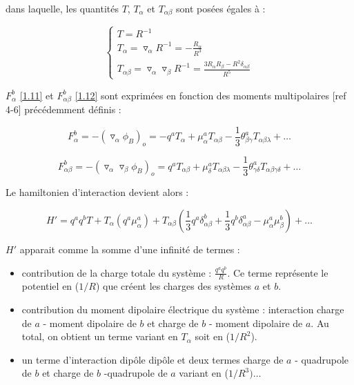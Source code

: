 dans laquelle, les quantités $T$, $T_{\alpha}$ et $T_{\alpha\beta}$ sont posées égales à :
	
\begin{equation}
	\begin{cases}
	T = R^{-1} \\
	T_{\alpha} = \triangledown_{\alpha} R^{-1} = - \frac{R_{\alpha}}{R^{3}}\\
	T_{\alpha\beta} = \triangledown_{\alpha} \triangledown_{\beta} R^{-1} = \frac{3R_{\alpha} R_{\beta}- R^{2}\delta_{\alpha\beta}}{R^{5}}
	\end{cases}
\end{equation}
	
$F_{\alpha}^{b}$ \ref{1.11} et $F_{\alpha\beta}^{b}$ \ref{1.12} sont exprimées en fonction des moments multipolaires [ref 4-6] précédemment définis : 

\begin{equation}
F_{\alpha}^{b} = -(\triangledown_{\alpha}\phi_{B})_{o} = -q^{a} T_{\alpha} + \mu_{\alpha}^{a} T_{\alpha\beta} - \frac{1}{3} \theta_{\beta\gamma}^{a} T_{\alpha\beta\lambda} + \ldots 
\end{equation}
	
\begin{equation}
F_{\alpha\beta}^{b} = -(\triangledown_{\alpha} \triangledown_{\beta}\phi_{B})_{o} = q^{a} T_{\alpha\beta} + \mu_{\delta}^{a} T_{\alpha\beta\lambda} - \frac{1}{3} \theta_{\gamma\delta}^{a} T_{\alpha\beta\gamma\delta} + \ldots 
\end{equation}
	
Le hamiltonien d'interaction devient alors : 
	
\begin{equation}
H' = q^{a} q^{b} T + T_{\alpha}(q^{a} \mu_{\alpha}^{a}) + T_{\alpha\beta} (\frac{1}{3}q^{a}\delta^{b}_{\alpha\beta}+ \frac{1}{3} q^{b}\delta^{a}_{\alpha\beta} - \mu_{\alpha}^{a}\mu_{\beta}^{b}) + \ldots  \label{1.19}
\end{equation}
	
$H'$ apparait comme la somme d'une infinité de termes : 
	
\begin{itemize}
	\item contribution de la charge totale du système : $\frac{q^{a}q^{b}}{R}$. Ce terme représente le potentiel en ($1/R$) que créent les charges des systèmes $a$ et $b$.
	\item contribution du moment dipolaire électrique du système : interaction charge de $a$ - moment dipolaire de $b$ et charge de $b$ - moment dipolaire de $a$. Au total, on obtient un terme variant en $T_{\alpha}$ soit en ($1/R^{2}$).	
	\item un terme d'interaction dipôle dipôle et deux termes charge de $a$ - quadrupole de $b$ et charge de $b$ -quadrupole de $a$ variant en ($1/R^{3}) \ldots$
\end{itemize}
	
